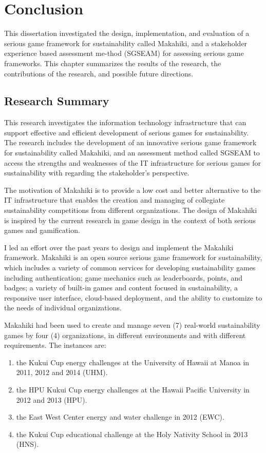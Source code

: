 \chapter{Conclusion}
\label{cha:conclusion}

This dissertation investigated the design, implementation, and evaluation of a serious game framework for sustainability called Makahiki, and a stakeholder experience based assessment me-thod (SGSEAM) for assessing serious game frameworks. This chapter summarizes the results of the research, the contributions of the research, and possible future directions.

\section{Research Summary}

This research investigates the information technology infrastructure that can support effective and efficient development of serious games for sustainability. The research includes the development of an innovative serious game framework for sustainability called Makahiki, and an assessment method called SGSEAM to access the strengths and weaknesses of the IT infrastructure for serious games for sustainability with regarding the stakeholder's perspective.

The motivation of Makahiki is to provide a low cost and better alternative to the IT infrastructure that enables the creation and managing of collegiate sustainability competitions from different organizations. The design of Makahiki is inspired by the current research in game design in the context of both serious games and gamification. 

I led an effort over the past years to design and implement the Makahiki framework. Makahiki is an open source serious game framework for sustainability, which includes a variety of common services for developing sustainability games including authentication; game mechanics such as leaderboards, points, and badges; a variety of built-in games and content focused in sustainability, a responsive user interface, cloud-based deployment, and the ability to customize to the needs of individual organizations.

Makahiki had been used to create and manage seven (7) real-world sustainability games by four (4) organizations, in different environments and with different requirements. The instances are: 
\begin{enumerate}
\item the Kukui Cup energy challenges at the University of Hawaii at Manoa in 2011, 2012 and 2014 (UHM).
\item the HPU Kukui Cup energy challenges at the Hawaii Pacific University in 2012 and 2013 (HPU).
\item the East West Center energy and water challenge in 2012 (EWC).
\item the Kukui Cup educational challenge at the Holy Nativity School in 2013 (HNS). 
\end{enumerate}

